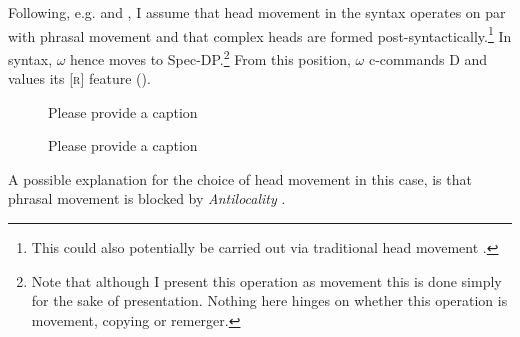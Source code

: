 \documentclass[output=paper,colorlinks,citecolor=brown,
]{langscibook}
\begin{document}
Following, e.g. \citet{Matushanski:2006ud} and \citet{Harizanov:2018ep}, I assume that head movement in the syntax operates on par with phrasal movement and that complex heads are formed post-syntactically.\footnote{This could also potentially be carried out via traditional head movement \citep[cf.][]{Hardarson:2016wd}.} In syntax, $\omega$ hence moves to Spec-DP.\footnote{Note that although I present this operation as movement this is done simply for the sake of presentation. Nothing here hinges on whether this operation is movement, copying or remerger.} From this position, $\omega$ c-commands D and values its [\textsc{r}] feature ().

\begin{figure}
\begin{floatrow}
	{\caption{\color{red}Please provide a caption}\label{hardarsonPatIIIbase}}
	{\caption{\color{red}Please provide a caption}\label{hardarsonNtoD}}
\end{floatrow}
\end{figure}

A possible explanation for the choice of head movement in this case, is that phrasal movement is blocked by \textit{Antilocality} \citep[e.g.,][]{Grohmann:2000td,abels2003}.
\end{document}
